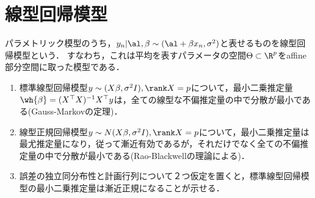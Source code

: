 \documentclass[uplatex,dvipdfmx]{jsreport}
\begin{document}
\section{線型回帰模型}

\begin{tcolorbox}[colframe=ForestGreen, colback=ForestGreen!10!white,breakable,colbacktitle=ForestGreen!40!white,coltitle=black,fonttitle=\bfseries\sffamily,
title=]
    パラメトリック模型のうち，$y_n|\al,\beta\sim(\al+\beta x_n,\sigma^2)$と表せるものを線型回帰模型という．
    すなわち，これは平均を表すパラメータの空間$\Theta\subset\R^p$をaffine部分空間に取った模型である．
    \begin{enumerate}
        \item 標準線型回帰模型$y\sim (X\beta,\sigma^2I),\rank X=p$について，最小二乗推定量$\wh{\beta}=(X^\top X)^{-1}X^\top y$は，全ての線型な不偏推定量の中で分散が最小である(Gauss-Markovの定理)．
        \item 線型正規回帰模型$y\sim N(X\beta,\sigma^2I),\rank X=p$について，最小二乗推定量は最尤推定量になり，従って漸近有効であるが，それだけでなく全ての不偏推定量の中で分散が最小である(Rao-Blackwellの理論による)．
        \item 誤差の独立同分布性と計画行列について２つ仮定を置くと，標準線型回帰模型の最小二乗推定量は漸近正規になることが示せる．
    \end{enumerate}
\end{tcolorbox}
\end{document}
